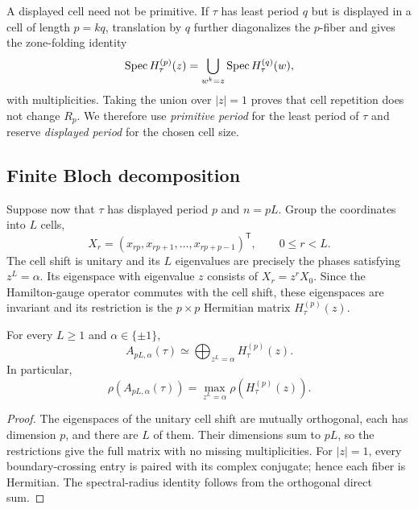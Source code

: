 A displayed cell need not be primitive.  If $\tau$ has least period $q$ but
is displayed in a cell of length $p=kq$, translation by $q$ further
diagonalizes the $p$-fiber and gives the zone-folding identity
\begin{equation}
 \operatorname{Spec} H_\tau^{(p)}(z)
  =\bigcup_{w^k=z}\operatorname{Spec} H_\tau^{(q)}(w),
 \label{eq:zone-folding}
\end{equation}
with multiplicities.  Taking the union over $|z|=1$ proves that cell
repetition does not change $R_p$.  We therefore use \emph{primitive period}
for the least period of $\tau$ and reserve \emph{displayed period} for the
chosen cell size.

\subsection{Finite Bloch decomposition}
\label{sec:finite-bloch}

Suppose now that $\tau$ has displayed period $p$ and $n=pL$.  Group the
coordinates into $L$ cells,
\[
 X_r=(x_{rp},x_{rp+1},\ldots,x_{rp+p-1})^{\mathsf T},
 \qquad 0\leq r<L.
\]
The cell shift is unitary and its $L$ eigenvalues are precisely the phases
satisfying $z^L=\alpha$.  Its eigenspace with eigenvalue $z$ consists of
$X_r=z^rX_0$.  Since the Hamilton-gauge operator commutes with the cell shift,
these eigenspaces are invariant and its restriction is the $p\times p$
Hermitian matrix $H_\tau^{(p)}(z)$.

\begin{proposition}
\label{prop:finite-bloch}
For every $L\geq1$ and $\alpha\in\{\pm1\}$,
\begin{equation}
 A_{pL,\alpha}(\tau)
 \simeq\bigoplus_{z^L=\alpha}H_\tau^{(p)}(z).
 \label{eq:finite-bloch-sum}
\end{equation}
In particular,
\begin{equation}
 \rho(A_{pL,\alpha}(\tau))
 =\max_{z^L=\alpha}\rho(H_\tau^{(p)}(z)).
 \label{eq:finite-radius-max}
\end{equation}
\end{proposition}

\begin{proof}
The eigenspaces of the unitary cell shift are mutually orthogonal, each has
dimension $p$, and there are $L$ of them.  Their dimensions sum to $pL$, so
the restrictions give the full matrix with no missing multiplicities.  For
$|z|=1$, every boundary-crossing entry is paired with its complex conjugate;
hence each fiber is Hermitian.  The spectral-radius identity follows from the
orthogonal direct sum.
\end{proof}

